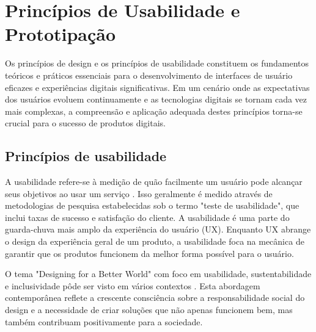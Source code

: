 \chapter{Princípios de Usabilidade e Prototipação}

Os princípios de design e os princípios de usabilidade constituem os fundamentos teóricos e práticos essenciais para o desenvolvimento de interfaces de usuário eficazes e experiências digitais significativas. Em um cenário onde as expectativas dos usuários evoluem continuamente e as tecnologias digitais se tornam cada vez mais complexas, a compreensão e aplicação adequada destes princípios torna-se crucial para o sucesso de produtos digitais.


\section{Princípios de usabilidade}

A usabilidade refere-se à medição de quão facilmente um usuário pode alcançar seus objetivos ao usar um serviço \cite{digital_gov_usability}. Isso geralmente é medido através de metodologias de pesquisa estabelecidas sob o termo "teste de usabilidade", que inclui taxas de sucesso e satisfação do cliente. A usabilidade é uma parte do guarda-chuva mais amplo da experiência do usuário (UX). Enquanto UX abrange o design da experiência geral de um produto, a usabilidade foca na mecânica de garantir que os produtos funcionem da melhor forma possível para o usuário.

O tema "Designing for a Better World" com foco em usabilidade, sustentabilidade e inclusividade pôde ser visto em vários contextos \cite{world_usability_day}. Esta abordagem contemporânea reflete a crescente consciência sobre a responsabilidade social do design e a necessidade de criar soluções que não apenas funcionem bem, mas também contribuam positivamente para a sociedade.

